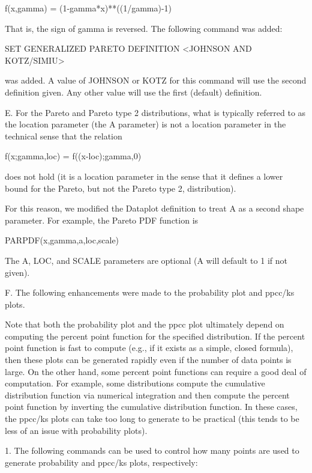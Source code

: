 {          f(x,gamma) = (1-gamma*x)**((1/gamma)-1)

       That is, the sign of gamma is reversed.  The following
       command was added:

          SET GENERALIZED PARETO DEFINITION <JOHNSON AND KOTZ/SIMIU>

       was added.  A value of JOHNSON or KOTZ for this command
       will use the second definition given.  Any other value
       will use the first (default) definition.

    E. For the Pareto and Pareto type 2 distributions, what is
       typically referred to as the location parameter (the A
       parameter) is not a location parameter in the technical
       sense that the relation

           f(x;gamma,loc) = f((x-loc);gamma,0)

       does not hold (it is a location parameter in the sense
       that it defines a lower bound for the Pareto, but not the
       Pareto type 2, distribution).

       For this reason, we modified the Dataplot definition to
       treat A as a second shape parameter.  For example, the
       Pareto PDF function is

           PARPDF(x,gamma,a,loc,scale)

       The A, LOC, and SCALE parameters are optional (A will
       default to 1 if not given).

    F. The following enhancements were made to the probability
       plot and ppcc/ks plots.
 
       Note that both the probability plot and the ppcc plot
       ultimately depend on computing the percent point function
       for the specified distribution.  If the percent point function
       is fast to compute (e.g., if it exists as a simple, closed
       formula), then these plots can be generated rapidly even if the
       number of data points is large.  On the other hand, some percent
       point functions can require a good deal of computation.  For
       example, some distributions compute the cumulative distribution
       function via numerical integration and then compute the percent
       point function by inverting the cumulative distribution
       function.  In these cases, the ppcc/ks plots can take too long
       to generate to be practical (this tends to be less of an issue
       with probability plots).
 
       1. The following commands can be used to control how many
          points are used to generate probability and ppcc/ks
          plots, respectively:
  
}
